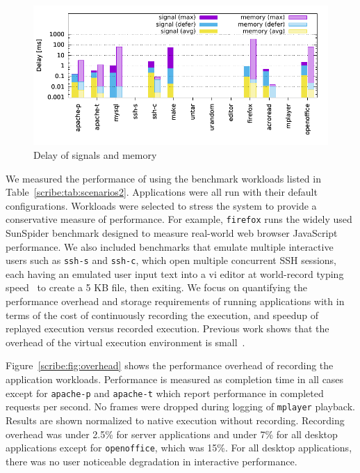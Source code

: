 \begin{table}[]
\begin{figure}[t]
    \centering
    \includegraphics[width=\linewidth]{figures/scribe/delays2}
  \vspace{-5em}
    \caption{Delay of signals and memory}
    \label{scribe:fig:delays}
\end{figure}

We measured the performance of \scribe{} using the benchmark workloads
listed in Table~\ref{scribe:tab:scenarios2}.
Applications were all run with
their default configurations.  Workloads were selected to
stress the system to provide a conservative measure of performance.
For example, {\tt firefox} runs the widely used SunSpider benchmark
designed to measure real-world web browser JavaScript performance.  
We also included benchmarks that emulate multiple interactive users
such as {\tt ssh-s} and {\tt ssh-c}, which open multiple concurrent
SSH sessions, each having an emulated user input text into a vi editor
at world-record typing speed~\cite{typist} to create a 5 KB file, then
exiting. We focus on quantifying the performance overhead and storage
requirements of running applications with \scribe{} in terms of the
cost of continuously recording the execution, and speedup of replayed
execution versus recorded execution. Previous work shows that the
overhead of the virtual execution environment is
small~\cite{zap-systor10,zap02}.

Figure~\ref{scribe:fig:overhead} shows the performance overhead of recording
the application workloads.  Performance is measured as completion time
in all cases except for {\tt apache-p} and {\tt apache-t} which report
performance in completed requests per second. No frames were dropped
during logging of {\tt mplayer} playback.  Results are shown
normalized to native execution without recording.  Recording overhead
was under 2.5\% for server applications and under 7\% for all desktop
applications except for {\tt openoffice}, which was 15\%.  For all desktop
applications, there was no user noticeable degradation in interactive
performance.


\end{table}
